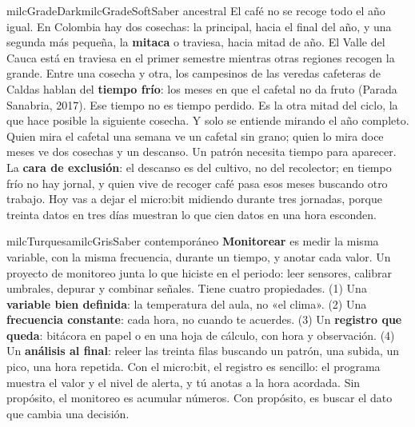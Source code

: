 \documentclass[11pt,letterpaper]{article}
\begin{document}
\begin{softbox}{milcGradeDark}{milcGradeSoft}{Saber ancestral}
El café no se recoge todo el año igual. En Colombia hay dos cosechas: la principal, hacia el final del año, y una segunda más pequeña, la \textbf{mitaca} o traviesa, hacia mitad de año. El Valle del Cauca está en traviesa en el primer semestre mientras otras regiones recogen la grande. Entre una cosecha y otra, los campesinos de las veredas cafeteras de Caldas hablan del \textbf{tiempo frío}: los meses en que el cafetal no da fruto (Parada Sanabria, 2017). Ese tiempo no es tiempo perdido. Es la otra mitad del ciclo, la que hace posible la siguiente cosecha. Y solo se entiende mirando el año completo. Quien mira el cafetal una semana ve un cafetal sin grano; quien lo mira doce meses ve dos cosechas y un descanso. Un patrón necesita tiempo para aparecer. La \textbf{cara de exclusión}: el descanso es del cultivo, no del recolector; en tiempo frío no hay jornal, y quien vive de recoger café pasa esos meses buscando otro trabajo. Hoy vas a dejar el micro:bit midiendo durante tres jornadas, porque treinta datos en tres días muestran lo que cien datos en una hora esconden.\par{}
\end{softbox}

\begin{softbox}{milcTurquesa}{milcGris}{Saber contemporáneo}
\textbf{Monitorear} es medir la misma variable, con la misma frecuencia, durante un tiempo, y anotar cada valor. Un proyecto de monitoreo junta lo que hiciste en el periodo: leer sensores, calibrar umbrales, depurar y combinar señales. Tiene cuatro propiedades. (1) Una \textbf{variable bien definida}: la temperatura del aula, no «el clima». (2) Una \textbf{frecuencia constante}: cada hora, no cuando te acuerdes. (3) Un \textbf{registro que queda}: bitácora en papel o en una hoja de cálculo, con hora y observación. (4) Un \textbf{análisis al final}: releer las treinta filas buscando un patrón, una subida, un pico, una hora repetida. Con el micro:bit, el registro es sencillo: el programa muestra el valor y el nivel de alerta, y tú anotas a la hora acordada. Sin propósito, el monitoreo es acumular números. Con propósito, es buscar el dato que cambia una decisión.
\end{softbox}
\end{document}
